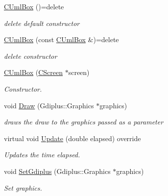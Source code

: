 \begin{DoxyCompactItemize}
\item 
\mbox{\label{class_c_uml_box_a4ef1ca09e7e21e5de6d2ff4c9d23072a}} 
\mbox{\hyperlink{class_c_uml_box_a4ef1ca09e7e21e5de6d2ff4c9d23072a}{C\+Uml\+Box}} ()=delete
\begin{DoxyCompactList}\small\item\em delete default constructor \end{DoxyCompactList}\item 
\mbox{\label{class_c_uml_box_a83f68d90bd59ade76c272c01504455b7}} 
\mbox{\hyperlink{class_c_uml_box_a83f68d90bd59ade76c272c01504455b7}{C\+Uml\+Box}} (const \mbox{\hyperlink{class_c_uml_box}{C\+Uml\+Box}} \&)=delete
\begin{DoxyCompactList}\small\item\em delete constructor \end{DoxyCompactList}\item 
\mbox{\hyperlink{class_c_uml_box_a33ef82a7e08fb8882c771d5117cd698f}{C\+Uml\+Box}} (\mbox{\hyperlink{class_c_screen}{C\+Screen}} $\ast$screen)
\begin{DoxyCompactList}\small\item\em Constructor. \end{DoxyCompactList}\item 
void \mbox{\hyperlink{class_c_uml_box_a9f4f8ae512bae9039279a62923435846}{Draw}} (Gdiplus\+::\+Graphics $\ast$graphics)
\begin{DoxyCompactList}\small\item\em draws the draw to the graphics passed as a parameter \end{DoxyCompactList}\item 
virtual void \mbox{\hyperlink{class_c_uml_box_a75d4af7b7c119ff62babceb345d81427}{Update}} (double elapsed) override
\begin{DoxyCompactList}\small\item\em Updates the time elapsed. \end{DoxyCompactList}\item 
void \mbox{\hyperlink{class_c_uml_box_aaf5b357b669c38c2ed74cd157ddccb76}{Set\+Gdiplus}} (Gdiplus\+::\+Graphics $\ast$graphics)
\begin{DoxyCompactList}\small\item\em Set graphics. \end{DoxyCompactList}\item 

\end{DoxyCompactItemize}
